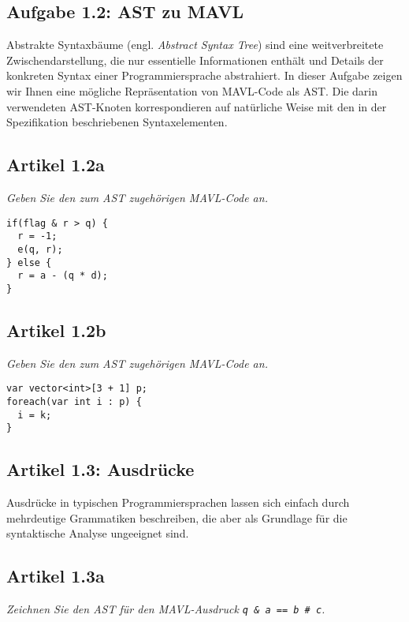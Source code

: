 \documentclass[
  ngerman,
  DIV=14
]{scrartcl}
\begin{document}
\subsection*{Aufgabe 1.2: AST zu MAVL}
Abstrakte Syntaxbäume (engl. \emph{Abstract Syntax Tree}) sind eine weitverbreitete Zwischendarstellung, die nur essentielle Informationen enthält und Details der konkreten Syntax einer Programmiersprache abstrahiert. In dieser Aufgabe zeigen wir Ihnen eine mögliche Repräsentation von MAVL-Code als AST. Die darin verwendeten AST-Knoten korrespondieren auf natürliche Weise mit den in der Spezifikation beschriebenen Syntaxelementen. 

\subsection*{Artikel 1.2a}
\emph{Geben Sie den zum AST zugehörigen MAVL-Code an.}  

\bigskip\noindent
\begin{lstlisting}
if(flag & r > q) {
  r = -1;
  e(q, r);
} else {
  r = a - (q * d);
}
\end{lstlisting}


\subsection*{Artikel 1.2b}
\emph{Geben Sie den zum AST zugehörigen MAVL-Code an.}

\bigskip\noindent
\begin{lstlisting}
var vector<int>[3 + 1] p;
foreach(var int i : p) {
  i = k;
}  
\end{lstlisting}


\subsection*{Artikel 1.3: Ausdrücke}
Ausdrücke in typischen Programmiersprachen lassen sich einfach durch mehrdeutige Grammatiken beschreiben, die aber als Grundlage für die syntaktische Analyse ungeeignet sind.

\subsection*{Artikel 1.3a}
\emph{Zeichnen Sie den AST für den MAVL-Ausdruck \texttt{q \& a == b \# c}.}


\bigskip\noindent
{}
\end{document}
